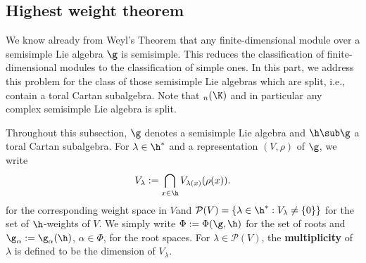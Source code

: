\subsection{Highest weight theorem}
We know already from Weyl's Theorem that any finite-dimensional module over a semisimple Lie algebra $\g$ is semisimple. This reduces the classification of finite-dimensional modules to the classification of simple ones. In this part, we address this problem for the class of those semisimple Lie algebras which are split, i.e., contain a toral Cartan subalgebra. Note that $\sl_n(\K)$ and in particular any complex semisimple Lie algebra is split.\par
Throughout this subsection, $\g$ denotes a semisimple Lie algebra and $\h\sub\g$ a toral Cartan subalgebra. For $\lambda\in\h^*$ and a representation $(V,\rho)$ of $\g$, we write
\[V_\lambda:=\bigcap_{x\in\h}V_{\lambda(x)}(\rho(x)).\]
for the corresponding weight space in $V $and $\mathcal{P}(V)=\{\lambda\in\h^*:V_\lambda\neq\{0\}\}$ for the set of $\h$-weights of $V$. We simply write $\Phi:=\Phi(\g,\h)$ for the set of roots and $\g_\alpha:=\g_\alpha(\h)$, $\alpha\in\Phi$, for the root spaces. For $\lambda\in\mathcal{P}(V)$, the \textbf{multiplicity} of $\lambda$ is defined to be the dimension of $V_\lambda$.
